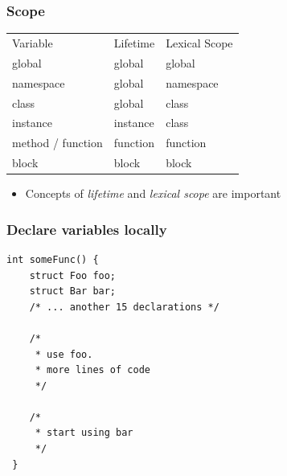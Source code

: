 \documentclass[table]{beamer}
\newcounter{rulecount}
\newcommand{\declarerule}{\textbf{\color{themeblue}{Rule \therulecount:}} }
\newcommand{\declarelesson}{\textbf{\color{themegreen}{Lesson:}} }
\begin{document}
\begin{frame}
    \frametitle{\declarelesson Scope}

    \begin{table}[tl]
        \begin{tabular}{p{3cm}p{2.5cm}p{2.5cm}}
            \rowcolor{codebg}
            \color{white} Variable & \color{white} Lifetime & \color{white} Lexical Scope\\
                          global & global & global \\
                       namespace & global & namespace \\
                        class & global & class \\
                     instance & instance & class \\
                     method / function & function & function \\
                     block & block & block \\
        \end{tabular}
    \end{table}
    \begin{itemize}
        \item Concepts of \emph{lifetime} and \emph{lexical scope} are important
    \end{itemize}
\end{frame}




\begin{frame}[fragile]
    \frametitle{\declarerule Declare variables locally}
    \begin{lstlisting}[title=In ANSI C variables must be declared at the beginning of scope]
int someFunc() {
    struct Foo foo;
    struct Bar bar;
    /* ... another 15 declarations */

    /* 
     * use foo.
     * more lines of code
     */

    /* 
     * start using bar
     */
 }
    \end{lstlisting}
\end{frame}
\end{document}
